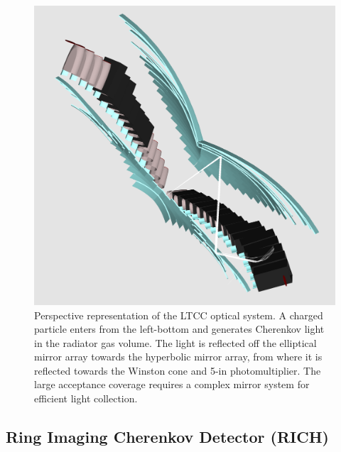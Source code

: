 \documentclass[final,3p,twocolumn]{elsarticle}
\begin{document}
\begin{figure}[htbp!]
\centerline{\includegraphics[width=1.0\columnwidth]{ltcc-mod6.png}}
\caption{Perspective representation of the LTCC optical system. A charged particle enters from the left-bottom and
generates Cherenkov light in the radiator gas volume. The light is reflected off the elliptical mirror array towards the
hyperbolic mirror array, from where it is reflected towards the Winston cone and 5-in photomultiplier. The large
acceptance coverage requires a complex mirror system for efficient light collection. }
\label{ltcc2}
\end{figure}

\subsection{Ring Imaging Cherenkov Detector (RICH)} 
\end{document}
